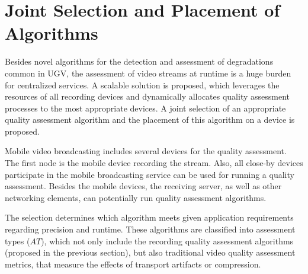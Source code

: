 \section{Joint Selection and Placement of Algorithms}
\label{sec:555_placement}
Besides novel algorithms for the detection and assessment of degradations common in \ac{UGV}, the assessment of video streams at runtime is a huge burden for centralized services.
A scalable solution is proposed, which leverages the resources of all recording devices and dynamically allocates quality assessment processes to the most appropriate devices.
A joint selection of an appropriate quality assessment algorithm and the placement of this algorithm on a device is proposed. 

Mobile video broadcasting includes several devices for the quality assessment.
The first node is the mobile device recording the stream.
Also, all close-by devices participate in the mobile broadcasting service can be used for running a quality assessment.
Besides the mobile devices, the receiving server, as well as other networking elements, can potentially run quality assessment algorithms.

The selection determines which algorithm meets given application requirements regarding precision and runtime.
These algorithms are classified into assessment types ($AT$), which not only include the recording quality assessment algorithms (proposed in the previous section), but also traditional video quality assessment metrics, that measure the effects of transport artifacts or compression.
